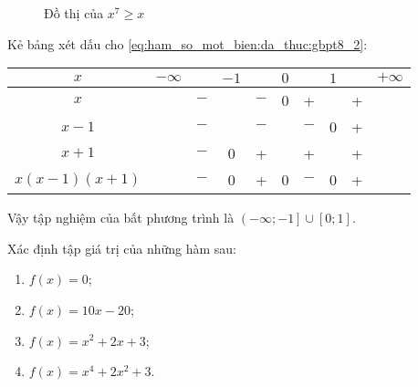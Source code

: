 {\begin{minipageindent}{0.4\textwidth}
\begin{figure}[H]
         \caption{Đồ thị của $x^7 \geq x$}
         \label{fig:ham_so_mot_bien:da_thuc:gbpt8}
      \end{figure}
   \end{minipageindent}
}

Kẻ bảng xét dấu cho \ref{eq:ham_so_mot_bien:da_thuc:gbpt8_2}:
\begin{table}[H]
   \centering
   \begin{tabular}{|c|ccccccccc|}
      \hline
      $x$           & $-\infty$ &     & $-1$ &     & $0$ &     & $1$ &   & $+\infty$ \\
      \hline
      $x$           &           & $-$ &      & $-$ &  0  &  +  &     & + &           \\
      \hline
      $x-1$         &           & $-$ &      & $-$ &     & $-$ &  0  & + &           \\
      \hline
      $x+1$         &           & $-$ &  0   &  +  &     &  +  &     & + &           \\
      \hline
      $x(x-1)(x+1)$ &           & $-$ &  0   &  +  &  0  & $-$ &  0  & + &           \\
      \hline
      \end{tabular}
\end{table}

Vậy tập nghiệm của bất phương trình là $\left(-\infty; -1\right] \cup \left[0; 1\right]$.

\exercise Xác định tập giá trị của những hàm sau:
\begin{multicols}{2}
   \begin{enumerate}
      \item $f(x) = 0$;
      \item $f(x) = 10x - 20$;
      \item $f(x) = x^2 + 2x + 3$;
      \item $f(x) = x^4 + 2x^2 + 3$.
   \end{enumerate}
\end{multicols}

